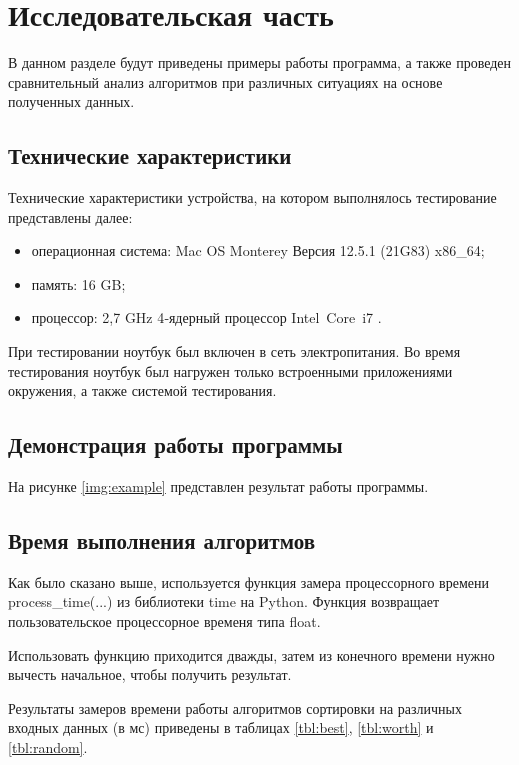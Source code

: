 \chapter{Исследовательская часть}

В данном разделе будут приведены примеры работы программа, а также проведен сравнительный анализ алгоритмов при различных ситуациях на основе полученных данных.

\section{Технические характеристики}

Технические характеристики устройства, на котором выполнялось тестирование представлены далее:

\begin{itemize}
	\item операционная система: Mac OS Monterey Версия 12.5.1 (21G83) \cite{macos} x86\_64;
	\item память: 16 GB;
	\item процессор: 2,7 GHz 4‑ядерный процессор Intel Core i7 \cite{intel}.
\end{itemize}

При тестировании ноутбук был включен в сеть электропитания. Во время тестирования ноутбук был нагружен только встроенными приложениями окружения, а также системой тестирования.

\section{Демонстрация работы программы}

На рисунке \ref{img:example} представлен результат работы программы.

\clearpage

\section{Время выполнения алгоритмов}

Как было сказано выше, используется функция замера процессорного времени process\_time(...) из библиотеки time на Python. Функция возвращает пользовательское процессорное временя типа float.

Использовать функцию приходится дважды, затем из конечного времени нужно вычесть начальное, чтобы получить результат.

Результаты замеров времени работы алгоритмов сортировки на различных входных данных (в мс) приведены в таблицах \ref{tbl:best}, \ref{tbl:worth} и \ref{tbl:random}.

